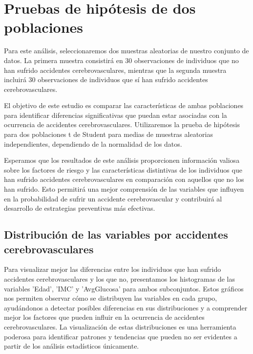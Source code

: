 \documentclass[a4paper, 12pt]{article}
\begin{document}
\newpage


\section{Pruebas de hipótesis de dos poblaciones}
Para este análisis, seleccionaremos dos muestras aleatorias de nuestro conjunto de datos. La primera muestra consistirá en 30 observaciones de individuos que no han sufrido accidentes cerebrovasculares, mientras que la segunda muestra incluirá 30 observaciones de individuos que sí han sufrido accidentes cerebrovasculares. 

El objetivo de este estudio es comparar las características de ambas poblaciones para identificar diferencias significativas que puedan estar asociadas con la ocurrencia de accidentes cerebrovasculares. Utilizaremos la prueba de hipótesis para dos poblaciones t de Student para medias de muestras aleatorias independientes, dependiendo de la normalidad de los datos.

Esperamos que los resultados de este análisis proporcionen información valiosa sobre los factores de riesgo y las características distintivas de los individuos que han sufrido accidentes cerebrovasculares en comparación con aquellos que no los han sufrido. Esto permitirá una mejor comprensión de las variables que influyen en la probabilidad de sufrir un accidente cerebrovascular y contribuirá al desarrollo de estrategias preventivas más efectivas.

\subsection{Distribución de las variables por accidentes cerebrovasculares}
Para visualizar mejor las diferencias entre los individuos que han sufrido accidentes cerebrovasculares y los que no, presentamos los histogramas de las variables 'Edad', 'IMC' y 'AvgGlucosa' para ambos subconjuntos. Estos gráficos nos permiten observar cómo se distribuyen las variables en cada grupo, ayudándonos a detectar posibles diferencias en sus distribuciones y a comprender mejor los factores que pueden influir en la ocurrencia de accidentes cerebrovasculares. La visualización de estas distribuciones es una herramienta poderosa para identificar patrones y tendencias que pueden no ser evidentes a partir de los análisis estadísticos únicamente.
\end{document}
